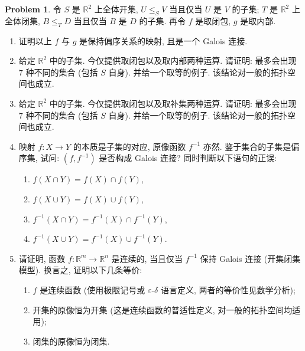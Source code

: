 \documentclass{MainStyle}
\theoremstyle{definition}
\newtheorem{problem}{Problem}
\begin{document}
\begin{problem}
令 $S$ 是 $\mathbb R^2$ 上全体开集, $U\leq _SV$ 当且仅当 $U$ 是 $V$ 的子集; $T$ 是 $\mathbb R^2$ 上全体闭集, $B\leq_TD$ 当且仅当 $B$ 是 $D$ 的子集. 再令 $f$ 是取闭包, $g$ 是取内部.
\begin{enumerate}
    \item 证明以上 $f$ 与 $g$ 是保持偏序关系的映射, 且是一个 Galois 连接.
    \item 给定 $\mathbb R^2$ 中的子集. 今仅提供取闭包以及取内部两种运算. 请证明: 最多会出现 $7$ 种不同的集合 (包括 $S$ 自身). 并给一个取等的例子. 该结论对一般的拓扑空间也成立.
    \item 给定 $\mathbb R^2$ 中的子集. 今仅提供取闭包以及取补集两种运算. 请证明: 最多会出现 $7$ 种不同的集合 (包括 $S$ 自身). 并给一个取等的例子. 该结论对一般的拓扑空间也成立.
    \item 映射 $f:X\to Y$ 的本质是子集的对应, 原像函数 $f^{-1}$ 亦然. 鉴于集合的子集是偏序集, 试问: $(f,f^{-1})$ 是否构成 Galois 连接? 同时判断以下语句的正误:
          \begin{enumerate}
              \item $f(X\cap Y)=f(X)\cap f(Y)$,
              \item $f(X\cup Y)=f(X)\cup f(Y)$,
              \item $f^{-1}(X\cap Y)=f^{-1}(X)\cap f^{-1}(Y)$,
              \item $f^{-1}(X\cup Y)=f^{-1}(X)\cup f^{-1}(Y)$.
          \end{enumerate}
    \item 请证明, 函数 $f:\mathbb R^m\to \mathbb R^n$ 是连续的, 当且仅当 $f^{-1}$ 保持 Galois 连接 (开集闭集模型). 换言之, 证明以下几条等价:
          \begin{enumerate}
              \item $f$ 是连续函数 (使用极限记号或 $\varepsilon$-$\delta$ 语言定义, 两者的等价性见数学分析);
              \item 开集的原像恒为开集 (这是连续函数的普适性定义, 对一般的拓扑空间均适用);
              \item 闭集的原像恒为闭集.
          \end{enumerate}
\end{enumerate}
\end{problem}
\end{document}
